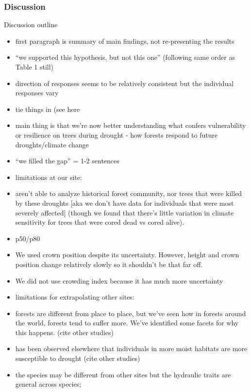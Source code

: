 \documentclass[]{article}
\providecommand{\tightlist}{%
  \setlength{\itemsep}{0pt}\setlength{\parskip}{0pt}}
\begin{document}
\subsubsection{Discussion}\label{discussion}

Discussion outline

\begin{itemize}
\tightlist
\item
  first paragraph is summary of main findings, not re-presenting the
  results
\item
  ``we supported this hypothesis, but not this one'' (following same
  order as Table 1 still)
\item
  direction of responses seems to be relatively consistent but the
  individual responses vary
\item
  tie things in (see here
\item
  main thing is that we're now better understanding what confers
  vulnerability or resilience on trees during drought - how forests
  respond to future droughts/climate change
\item
  ``we filled the gap'' = 1-2 sentences
\item
  limitations at our site:
\item
  aren't able to analyze historical forest community, nor trees that
  were killed by these droughts {[}aka we don't have data for
  individuals that were most severely affected{]} (though we found that
  there's little variation in climate sensitivity for trees that were
  cored dead vs cored alive).
\item
  p50/p80
\item
  We used crown position despite its uncertainty. However, height and
  crown position change relatively slowly so it shouldn't be that far
  off.
\item
  We did not use crowding index because it has much more uncertainty
\item
  limitations for extrapolating other sites:
\item
  forests are different from place to place, but we've seen how in
  forests around the world, forests tend to suffer more. We've
  identified some facets for why this happens. (cite other studies)
\item
  has been observed elsewhere that individuals in more moist habitats
  are more susceptible to drought (cite other studies)
\item
  the species may be different from other sites but the hydraulic traits
  are general across species;

\end{itemize}
\end{document}
